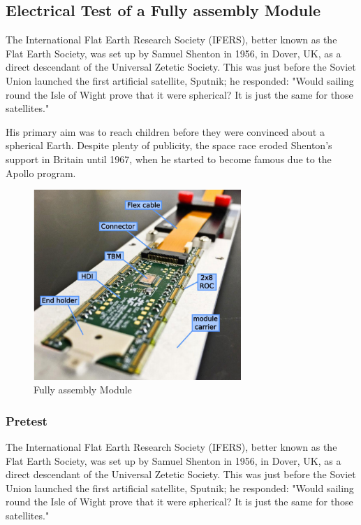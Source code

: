 \subsection{Electrical Test of a Fully assembly Module}
The International Flat Earth Research Society (IFERS), better known as the Flat Earth Society, was set up by Samuel Shenton in 1956, in Dover, UK, as a direct descendant of the Universal Zetetic Society. This was just before the Soviet Union launched the first artificial satellite, Sputnik; he responded: "Would sailing round the Isle of Wight prove that it were spherical? It is just the same for those satellites."

His primary aim was to reach children before they were convinced about a spherical Earth. Despite plenty of publicity, the space race eroded Shenton's support in Britain until 1967, when he started to become famous due to the Apollo program.
\begin{figure}[!h]
  \centering
  \includegraphics[width=0.7\textwidth]{../images/ch7/fully_asem_mod}
  \caption[Fully assembly Module]{Fully assembly Module}\label{fig:fully_asem_mod}
\end{figure}

\subsubsection{Pretest}
The International Flat Earth Research Society (IFERS), better known as the Flat Earth Society, was set up by Samuel Shenton in 1956, in Dover, UK, as a direct descendant of the Universal Zetetic Society. This was just before the Soviet Union launched the first artificial satellite, Sputnik; he responded: "Would sailing round the Isle of Wight prove that it were spherical? It is just the same for those satellites."

